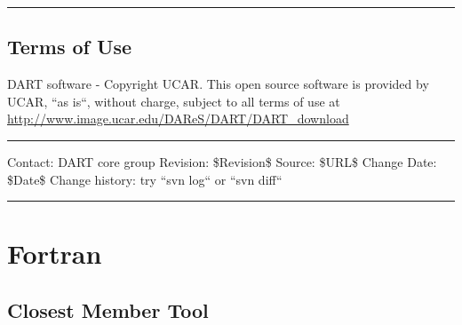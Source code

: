 \documentclass[letterpaper,10pt,english]{sphinxmanual}
\begin{document}
\bigskip\hrule{}\bigskip



\section{Terms of Use}
\label{docs/Lanai_diffs_from_Kodiak:terms-of-use}
DART software - Copyright UCAR. This open source software is provided by
UCAR, ``as is``, without charge, subject to all terms of use at
\url{http://www.image.ucar.edu/DAReS/DART/DART\_download}


\bigskip\hrule{}\bigskip


Contact:             DART core group
Revision:            \$Revision\$
Source:              \$URL\$
Change Date:         \$Date\$
Change history:      try ``svn log`` or ``svn diff``


\bigskip\hrule{}\bigskip



\chapter{Fortran}
\label{docs/auto-doc:fortran}\label{docs/auto-doc::doc}

\section{Closest Member Tool}
\label{docs/auto-doc:closest-member-tool}
\end{document}
